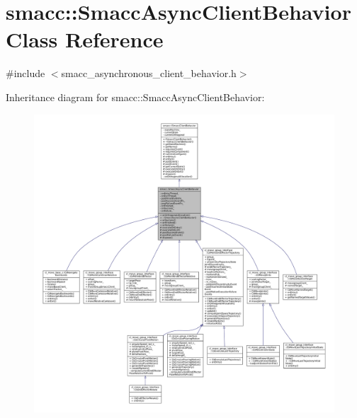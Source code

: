 \hypertarget{classsmacc_1_1SmaccAsyncClientBehavior}{}\section{smacc\+:\+:Smacc\+Async\+Client\+Behavior Class Reference}
\label{classsmacc_1_1SmaccAsyncClientBehavior}


{\ttfamily \#include $<$smacc\+\_\+asynchronous\+\_\+client\+\_\+behavior.\+h$>$}



Inheritance diagram for smacc\+:\+:Smacc\+Async\+Client\+Behavior\+:
\nopagebreak
\begin{figure}[H]
\begin{center}
\leavevmode
\includegraphics[width=350pt]{classsmacc_1_1SmaccAsyncClientBehavior__inherit__graph}
\end{center}
\end{figure}


